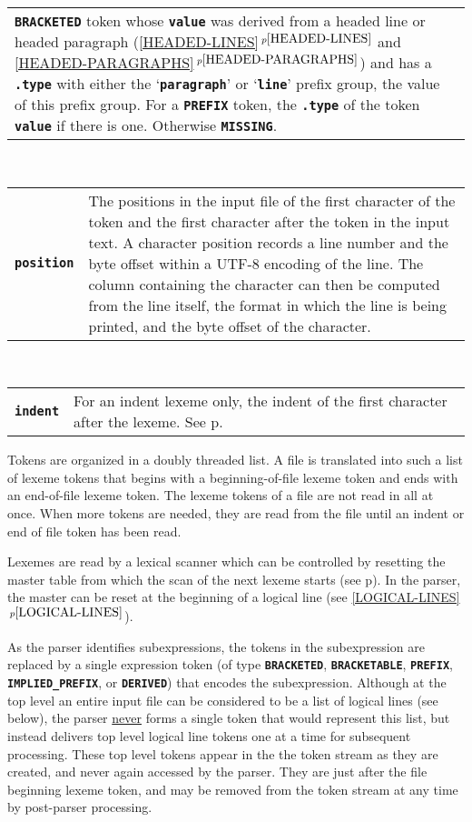 \documentclass[12pt]{article}
\makeatletter
\newcommand{\TT}[1]{{\tt \bfseries #1}}
\newcommand{\ttmkey}[2]{\TT{#1}\index{#1@\TT{#1}!#2}}
\newcommand{\itemref}[1]{\ref{#1}$\,^{p\pageref{#1}}$}
\newcommand{\pagref}[1]{p\pageref{#1}}
\newenvironment{indpar}[1][0.3in]%
	{\begin{list}{}%
		     {\setlength{\itemsep}{0in}%
		      \setlength{\topsep}{0in}%
		      \setlength{\parsep}{1ex}%
		      \setlength{\labelwidth}{#1}%
		      \setlength{\leftmargin}{#1}%
		      \addtolength{\leftmargin}{\labelsep}}%
	 \item}%
	{\end{list}}
\makeatother
\begin{document}
\begin{indpar}
\begin{tabular}{p{1in}p{4.5in}}
		  \TT{BRACKETED} token whose \TT{value} was derived
		  from a headed line or headed paragraph
		  (\itemref{HEADED-LINES} and \itemref{HEADED-PARAGRAPHS})
		  and has a \TT{.type}
		  with either the `\TT{paragraph}' or `\TT{line}'
		  prefix group, the value of this prefix group.
		  For a \TT{PREFIX} token, the \TT{.type} of the token
		  \TT{value} if there is one.  Otherwise \TT{MISSING}.
\end{tabular}
\\[1ex]
\begin{tabular}{p{1in}p{4.5in}}
\ttmkey{position}{of token}
		& The positions in the input file of
                  the first character of the token
		  and the first character after the token in the
		  input text.  A character position records a line number
		  and the byte offset within a UTF-8 encoding
		  of the line.  The column containing the character
		  can then be computed from the line itself, the format
		  in which the line is being printed, and the
		  byte offset of the character.
\end{tabular}
\\[1ex]
\begin{tabular}{p{1in}p{4.5in}}
\ttmkey{indent}{of token}
	        & For an indent lexeme only,
		  the indent of the first character after the lexeme.  See
		  \pagref{INDENT-OF-CHARACTER}.
\end{tabular}
\end{indpar}

Tokens are organized in a doubly threaded list.  A file is translated into
such a list of lexeme tokens that begins with a beginning-of-file lexeme token
and ends with an end-of-file lexeme token.
The lexeme tokens of a file are not read in all at once.  When more tokens
are needed, they are read from the file until an indent or end of file
token has been read.

Lexemes are read by a lexical scanner which can be controlled by
resetting the master table from which the scan of the next lexeme
starts (see \pagref{MASTER-TABLE}).  In the parser, the master
can be reset at the beginning of a logical line (see \itemref{LOGICAL-LINES}).

As the parser identifies subexpressions, the tokens in the
subexpression are replaced by a single expression token (of
type \TT{BRACKETED}, \TT{BRACKETABLE}, \TT{PREFIX},
\TT{IMPLIED\_PREFIX}, or \TT{DERIVED})
that encodes the subexpression.
Although at the top level an entire
input file can be considered to be a list of logical lines (see below),
the parser \underline{never}
forms a single token that would represent this list, but instead
delivers top level logical line tokens
one at a time for subsequent
processing.  These top level tokens appear in the
the token stream as they are created,
and never again accessed by the parser.
They are just after the file beginning
lexeme token, and may be removed from the token stream at any time
by post-parser processing.
\end{document}
